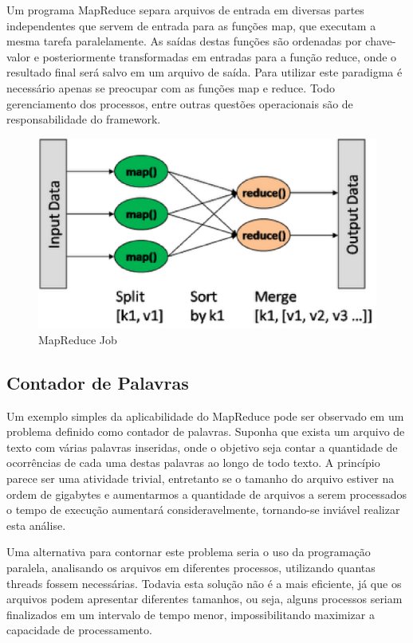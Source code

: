 Um programa MapReduce separa arquivos de entrada em diversas partes independentes que servem de entrada para as funções map, que executam a mesma tarefa paralelamente. As saídas destas funções são ordenadas por chave-valor e posteriormente transformadas em entradas para a função reduce, onde o resultado final será salvo em um arquivo de saída. Para utilizar este paradigma é necessário apenas se preocupar com as funções map e reduce. Todo gerenciamento dos processos, entre outras questões operacionais são de responsabilidade do framework.

\begin{figure}[h!]
	\centering
	\includegraphics[keepaspectratio=true,scale=0.45]
	  {figuras/mapreduce.eps}
	\caption{MapReduce Job}
	\label{fig-mapreduce}
\end{figure}

\subsection{Contador de Palavras}


Um exemplo simples da aplicabilidade do MapReduce pode ser observado em um problema definido como contador de palavras. Suponha que exista um arquivo de texto com várias palavras inseridas, onde o objetivo seja contar a quantidade de ocorrências de cada uma destas palavras ao longo de todo texto. A princípio parece ser uma atividade trivial, entretanto se o tamanho do arquivo estiver na ordem de gigabytes e aumentarmos a quantidade de arquivos a serem processados o tempo de execução aumentará consideravelmente, tornando-se inviável realizar esta análise.

Uma alternativa para contornar este problema seria o uso da programação paralela, analisando os arquivos em diferentes processos, utilizando quantas threads fossem necessárias. Todavia esta solução não é a mais eficiente, já que os arquivos podem apresentar diferentes tamanhos, ou seja, alguns processos seriam finalizados em um intervalo de tempo menor, impossibilitando maximizar a capacidade de processamento. 

